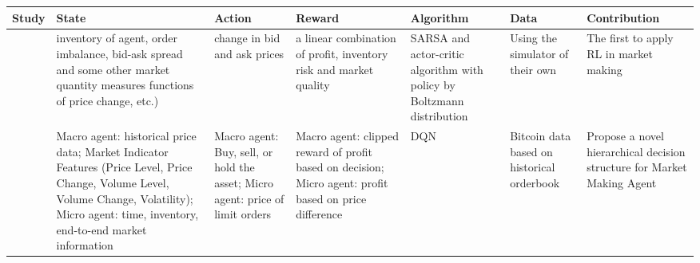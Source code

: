 \begin{table}
\begin{tabular}{ | m{2cm} | m{2.5cm}| m{2.5cm} | m{2.5cm} |m{1.7cm} |m{2cm} | m{2cm} | } 
  \hline
  Study & State & Action & Reward & Algorithm & Data & Contribution\\ 
  \hline

\citet{ chan2001electronic} & inventory of agent, order imbalance, bid-ask spread and some other market quantity measures functions of price change, etc.)& change in bid and ask prices & a linear combination of profit, inventory risk and
market quality & SARSA and actor-critic algorithm with policy by Boltzmann distribution & Using the simulator of their own & The first to apply RL in market making
\\
\hline


  \citet{Patel2018MM} & Macro agent: historical price data; Market Indicator Features (Price Level, Price Change, Volume Level,
Volume Change, Volatility); Micro agent: time, inventory, end-to-end market information & Macro agent: Buy, sell, or hold the asset; Micro agent: price of limit orders & Macro agent: clipped reward of profit based on decision; Micro agent: profit based on price difference & DQN & Bitcoin data based on historical orderbook& Propose a novel hierarchical decision structure for Market Making Agent\\ 
  \hline
  


\end{tabular}
\end{table}
